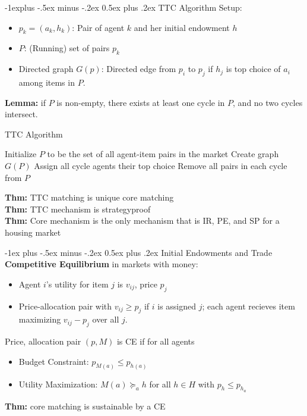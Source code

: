 \documentclass[10pt,landscape]{article}
\makeatletter
\renewcommand{\section}{\@startsection{section}{1}{0mm}%
                                {-1ex plus -.5ex minus -.2ex}%
                                {0.5ex plus .2ex}%
                                {\normalfont\large\bfseries}}
\renewcommand{\subsection}{\@startsection{subsection}{2}{0mm}%
                                {-1explus -.5ex minus -.2ex}%
                                {0.5ex plus .2ex}%
                                {\normalfont\normalsize\bfseries}}
\makeatother
\begin{document}
\begin{multicols*}{3}
\subsection{TTC Algorithm}
Setup:
\begin{itemize}
\item $p_k = (a_k, h_k)$: Pair of agent $k$ and her initial endowment $h$
\item $P$: (Running) set of pairs $p_k$
\item Directed graph $G(p)$: Directed edge from $p_i$ to $p_j$ if $h_j$ is top choice of $a_i$ among items in $P$.
\end{itemize}
\textbf{Lemma:} if $P$ is non-empty, there exists at least one cycle in $P$, and no two cycles intersect.
\begin{algorithm}[H]
  \caption{TTC Algorithm}
  \begin{algorithmic}
	\State Initialize $P$ to be the set of all agent-item pairs in the market
        \State Create graph $G(P)$
        \State Assign all cycle agents their top choice
        \State Remove all pairs in each cycle from $P$
    \EndWhile
  \end{algorithmic}
\end{algorithm}
\textbf{Thm:} TTC matching is unique core matching\\
\textbf{Thm:} TTC mechanism is strategyproof\\
\textbf{Thm:} Core mechanism is the only mechanism that is IR, PE, and SP for a housing market

\section{Initial Endowments and Trade}
\textbf{Competitive Equilibrium} in markets with money:\
\begin{itemize}
\item Agent $i$'s utility for item $j$ is $v_{ij}$, price $p_j$
\item Price-allocation pair with $v_{ij} \geq p_j$ if $i$ is assigned $j$; each agent recieves item maximizing $v_{ij} - p_j$ over all $j$.
\end{itemize}
Price, allocation pair $(p, M)$ is CE if for all agents
\begin{itemize}
\item Budget Constraint: $p_{M(a)} \leq p_{h(a)}$
\item Utility Maximization: $M(a) \succeq_a h$ for all $h \in H$ with $p_h \leq p_{h_a}$
\end{itemize}
\textbf{Thm:} core matching is sustainable by a CE


\end{multicols*}
\end{document}

